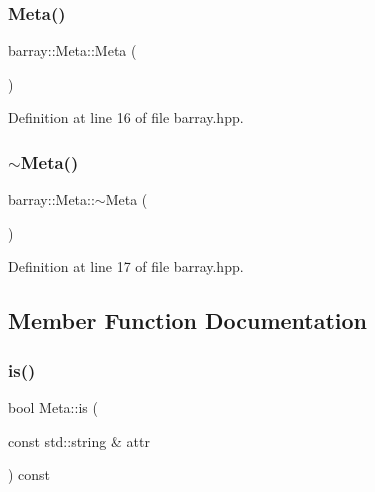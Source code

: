 \subsubsection{\texorpdfstring{Meta()}{Meta()}}
{\footnotesize\ttfamily barray\+::\+Meta\+::\+Meta (\begin{DoxyParamCaption}{ }\end{DoxyParamCaption})\hspace{0.3cm}{\ttfamily [inline]}}



Definition at line 16 of file barray.\+hpp.

\mbox{\label{classbarray_1_1_meta_a3473189e85a77777860000c3ebd466e3}} 
\subsubsection{\texorpdfstring{$\sim$\+Meta()}{~Meta()}}
{\footnotesize\ttfamily barray\+::\+Meta\+::$\sim$\+Meta (\begin{DoxyParamCaption}{ }\end{DoxyParamCaption})\hspace{0.3cm}{\ttfamily [inline]}}



Definition at line 17 of file barray.\+hpp.



\subsection{Member Function Documentation}
\mbox{\label{classbarray_1_1_meta_a935668f7ea11c899be35505093a15415}} 
\subsubsection{\texorpdfstring{is()}{is()}}
{\footnotesize\ttfamily bool Meta\+::is (\begin{DoxyParamCaption}\item[{const std\+::string \&}]{attr }\end{DoxyParamCaption}) const\hspace{0.3cm}{\ttfamily [inline]}}



